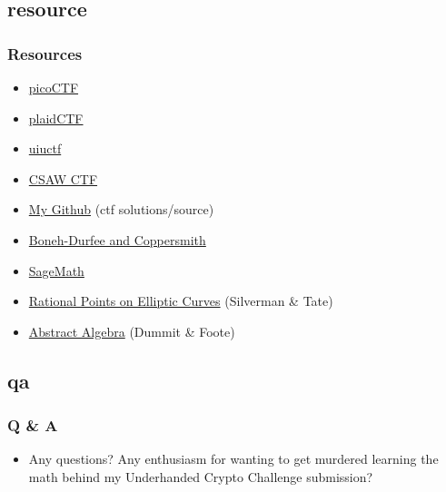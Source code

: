 \documentclass[aspectratio=169,t]{beamer}
\begin{document}
\subsection{resource}
\begin{frame}
\frametitle{Resources}
\begin{itemize}
\item
\href{https://picoctf.com/}{picoCTF}
\item
\href{http://plaidctf.com/}{plaidCTF}
\item
\href{https://uiuc.tf/contests/uiuctf-2017/}{uiuctf}
\item
\href{https://ctf.csaw.io/}{CSAW CTF}
\item
\href{https://github.com/incertia/}{My Github} (ctf solutions/source)
\item
\href{https://github.com/mimoo/RSA-and-LLL-attacks}{Boneh-Durfee and
Coppersmith}
\item
\href{http://www.sagemath.org/}{SageMath}
\item
\href{https://www.amazon.com/dp/0387978259}{Rational Points on Elliptic Curves}
(Silverman \& Tate)
\item
\href{https://www.amazon.com/dp/0471433349/}{Abstract Algebra} (Dummit \& Foote)
\end{itemize}
\end{frame}

\subsection{qa}
\begin{frame}
\frametitle{Q \& A}
\begin{itemize}
\item
Any questions? Any enthusiasm for wanting to get murdered learning the math
behind my Underhanded Crypto Challenge submission?
\end{itemize}
\end{frame}
\end{document}
